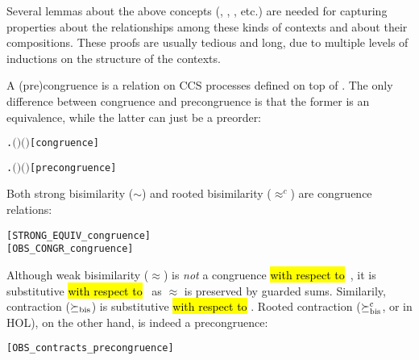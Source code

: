 Several
lemmas about the above concepts (, ,
, etc.) are needed for capturing properties about
 the relationships among these kinds of contexts and about their
 compositions. These proofs are usually tedious and long,  due to multiple levels of
 inductions on the structure of the contexts.

A (pre)congruence is a relation on CCS processes defined on top of
. The only difference between congruence and
precongruence is that the former is an equivalence,
while the latter can just be a preorder:
\begin{alltt}
     \HOLTokenDefEquality{}
       \HOLSymConst{\HOLTokenConj{}} \HOLSymConst{\HOLTokenForall{}}  .   \HOLSymConst{\HOLTokenImp{}}    \HOLSymConst{\HOLTokenImp{}}  \ensuremath{(} \ensuremath{)} \ensuremath{(} \ensuremath{)}\hfill{[congruence]}

     \HOLTokenDefEquality{}
       \HOLSymConst{\HOLTokenConj{}} \HOLSymConst{\HOLTokenForall{}}  .   \HOLSymConst{\HOLTokenImp{}}    \HOLSymConst{\HOLTokenImp{}}  \ensuremath{(} \ensuremath{)} \ensuremath{(} \ensuremath{)}\hfill{[precongruence]}
\end{alltt}

Both strong bisimilarity ($\sim$) and
rooted bisimilarity ($\approx^c$) are congruence relations:
\begin{alltt}
\HOLTokenTurnstile{}  \hfill{[STRONG_EQUIV_congruence]}
\HOLTokenTurnstile{}  \hfill{[OBS_CONGR_congruence]}
\end{alltt}

Although weak bisimilarity ($\approx$) is \emph{not} a congruence
\hl{with respect to}~, it is substitutive
\hl{with respect to}~
as $\approx$ is preserved by guarded sums. Similarily,
contraction ($\mathrel{\succeq_{\rm{bis}}}$) is substitutive \hl{with respect to} .
%
Rooted contraction ($\mathrel{\succeq^{\rm{c}}_{\rm{bis}}}$, or  in HOL), on
the other hand, is indeed a precongruence:
\begin{alltt}
\HOLTokenTurnstile{}  \hfill{[OBS_contracts_precongruence]}
\end{alltt}

